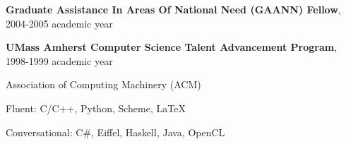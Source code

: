 \documentclass[11pt]{letter}
\begin{document}
\textbf{Graduate Assistance In Areas Of National Need (GAANN) Fellow}, 2004-2005 academic year

\textbf{UMass Amherst Computer Science Talent Advancement Program}, 1998-1999 academic year


Association of Computing Machinery (ACM) \\


Fluent: C/C++, Python, Scheme, LaTeX

Conversational: C\#, Eiffel, Haskell, Java, OpenCL
\end{document}
